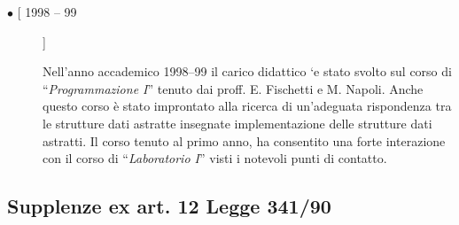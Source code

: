 \documentclass[11pt]{article}
\newlength{\boxsize}
\begin{document}
\begin{description}
\item [$ \bullet $ [ 1998 -- 99]] \hfill 
\parbox[t]{\boxsize} { Nell'anno accademico 1998--99 il carico
didattico \a`e stato svolto sul corso di ``{\sl Programmazione I}''
tenuto dai proff. E. Fischetti e M. Napoli.  Anche questo corso \`e
stato improntato alla ricerca di un'adeguata rispondenza tra le
strutture dati astratte insegnate implementazione delle strutture dati
astratti. Il corso tenuto al primo anno, ha consentito una forte
interazione con il corso di ``{\sl Laboratorio I}'' visti i notevoli
punti di contatto.

}
\end{description}

\subsection{Supplenze ex art. 12 Legge 341/90}
\end{document}
